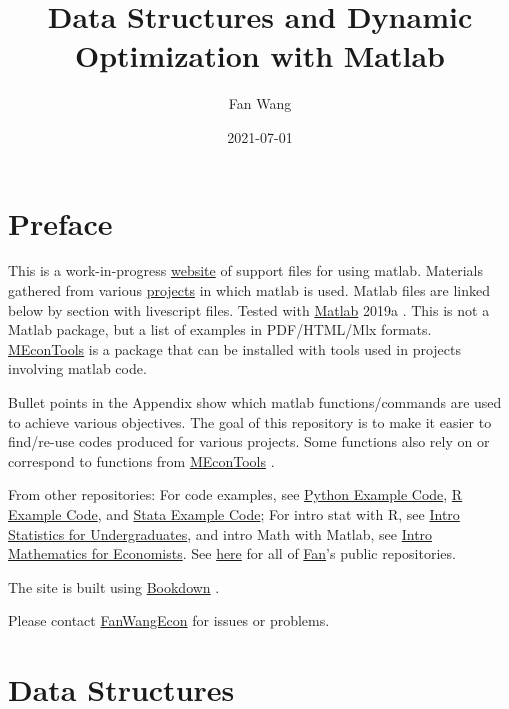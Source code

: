 \documentclass[
]{book}
\title{Data Structures and Dynamic Optimization with Matlab}
\author{Fan Wang}
\date{2021-07-01}
\begin{document}
\maketitle

{
\hypersetup{linkcolor=}
\setcounter{tocdepth}{2}
\tableofcontents
}
\hypertarget{preface}{%
\chapter*{Preface}\label{preface}}

This is a work-in-progress \href{https://fanwangecon.github.io/M4Econ/}{website} of support files for using matlab. Materials gathered from various \href{https://fanwangecon.github.io/research}{projects} in which matlab is used. Matlab files are linked below by section with livescript files. Tested with \href{https://www.mathworks.com/products/matlab.html}{Matlab} 2019a \citep{matlab}. This is not a Matlab package, but a list of examples in PDF/HTML/Mlx formats. \href{https://github.com/FanWangEcon/MEconTools}{MEconTools} is a package that can be installed with tools used in projects involving matlab code.

Bullet points in the Appendix show which matlab functions/commands are used to achieve various objectives. The goal of this repository is to make it easier to find/re-use codes produced for various projects. Some functions also rely on or correspond to functions from \href{https://github.com/FanWangEcon/MEconTools}{MEconTools} \citep{M-MEconTools}.

From other repositories: For code examples, see \href{https://fanwangecon.github.io/Py4Econ/}{Python Example Code}, \href{https://fanwangecon.github.io/R4Econ/}{R Example Code}, and \href{https://fanwangecon.github.io/Stata4Econ/}{Stata Example Code}; For intro stat with R, see \href{https://fanwangecon.github.io/Stat4Econ/}{Intro Statistics for Undergraduates}, and intro Math with Matlab, see \href{https://fanwangecon.github.io/Math4Econ/}{Intro Mathematics for Economists}. See \href{https://github.com/FanWangEcon}{here} for all of \href{https://fanwangecon.github.io/}{Fan}'s public repositories.

The site is built using \href{https://bookdown.org/}{Bookdown} \citep{R-bookdown}.

Please contact \href{https://fanwangecon.github.io/}{FanWangEcon} for issues or problems.

\hypertarget{data-structures}{%
\chapter{Data Structures}\label{data-structures}}
\end{document}
